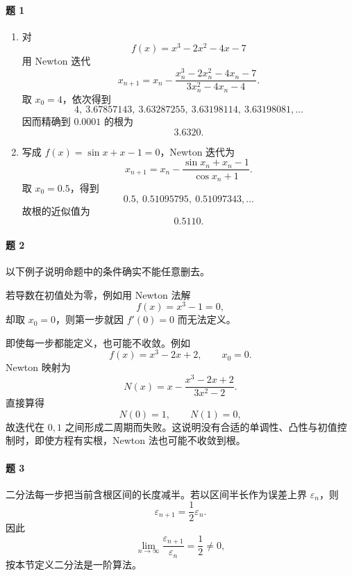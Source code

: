 \paragraph{题 1}
\begin{xsolution}
\begin{enumerate}[label=(\arabic*)]
  \item 对
  \[
    f(x)=x^3-2x^2-4x-7
  \]
  用 Newton 迭代
  \[
    x_{n+1}=x_n-\frac{x_n^3-2x_n^2-4x_n-7}{3x_n^2-4x_n-4}.
  \]
  取 $x_0=4$，依次得到
  \[
    4,\ 3.67857143,\ 3.63287255,\ 3.63198114,\ 3.63198081,\ldots
  \]
  因而精确到 $0.0001$ 的根为
  \[
    \boxed{3.6320}.
  \]

  \item 写成 $f(x)=\sin x+x-1=0$，Newton 迭代为
  \[
    x_{n+1}=x_n-\frac{\sin x_n+x_n-1}{\cos x_n+1}.
  \]
  取 $x_0=0.5$，得到
  \[
    0.5,\ 0.51095795,\ 0.51097343,\ldots
  \]
  故根的近似值为
  \[
    \boxed{0.5110}.
  \]
\end{enumerate}
\end{xsolution}

\paragraph{题 2}
\begin{xsolution}
以下例子说明命题中的条件确实不能任意删去。

若导数在初值处为零，例如用 Newton 法解
\[
  f(x)=x^3-1=0,
\]
却取 $x_0=0$，则第一步就因 $f'(0)=0$ 而无法定义。

即使每一步都能定义，也可能不收敛。例如
\[
  f(x)=x^3-2x+2,\qquad x_0=0.
\]
Newton 映射为
\[
  N(x)=x-\frac{x^3-2x+2}{3x^2-2}.
\]
直接算得
\[
  N(0)=1,\qquad N(1)=0,
\]
故迭代在 $0,1$ 之间形成二周期而失败。这说明没有合适的单调性、凸性与初值控制时，即使方程有实根，Newton 法也可能不收敛到根。
\end{xsolution}

\paragraph{题 3}
\begin{xsolution}
二分法每一步把当前含根区间的长度减半。若以区间半长作为误差上界 $\varepsilon_n$，则
\[
  \varepsilon_{n+1}=\frac12\varepsilon_n.
\]
因此
\[
  \lim_{n\to\infty}\frac{\varepsilon_{n+1}}{\varepsilon_n}=\frac12\ne0,
\]
按本节定义二分法是一阶算法。
\end{xsolution}

